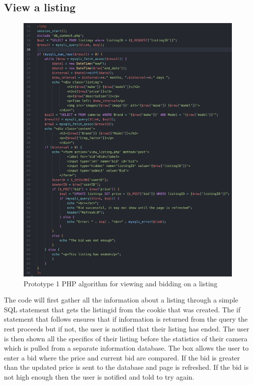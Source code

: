 \subsection{View a listing}
\begin{figure}[H]
    \centering
    \includegraphics[scale=0.5]{ch3_developing/proto1/pro1_view.png}
    \caption{Prototype 1 PHP algorithm for viewing and bidding on a listing}
    \label{fig:pro1_view}
\end{figure}
The code will first gather all the information about a listing through a simple SQL statement that gets the listingid from the cookie that was created. The if statement that follows ensures that if information is returned from the query the rest proceeds but if not, the user is notified that their listing has ended.  The user is then shown all the specifics of their listing before the statistics of their camera which is pulled from a separate information database. The box allows the user to enter a bid where the price and current bid are compared. If the bid is greater than the updated price is sent to the database and page is refreshed. If the bid is not high enough then the user is notified and told to try again.

